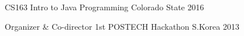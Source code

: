

\begin{cvhonors}

  \cvhonor
    {CS163} %
    {Intro to Java Programming} %
    {Colorado State} %
    {2016} %

  \cvhonor
    {Organizer \& Co-director} %
    {1st POSTECH Hackathon} %
    {S.Korea} %
    {2013} %
    
    \end{cvhonors}

